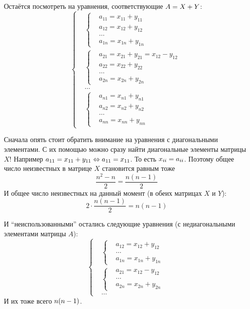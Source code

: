\documentclass[a4paper,12pt]{article}
\begin{document}
\begin{solution}
    Остаётся посмотреть на уравнения, соответствующие $A \hm= X \hm+ Y$:
    \[
      \left\{
      \begin{aligned}
        &\left\{
        \begin{aligned}
          &a_{11} = x_{11} + y_{11}\\
          &a_{12} = x_{12} + y_{12}\\
          &\ldots\\
          &a_{1n} = x_{1n} + y_{1n}
        \end{aligned}\right.\\
        &\left\{
        \begin{aligned}
          &a_{21} = x_{21} + y_{21} = x_{12} - y_{12}\\
          &a_{22} = x_{22} + y_{22}\\
          &\ldots\\
          &a_{2n} = x_{2n} + y_{2n}
        \end{aligned}\right.\\
        &\ldots\\
        &\left\{
        \begin{aligned}
          &a_{n1} = x_{n1} + y_{n1}\\
          &a_{n2} = x_{n2} + y_{n2}\\
          &\ldots\\
          &a_{nn} = x_{nn} + y_{nn}
        \end{aligned}\right.
      \end{aligned}
      \right.
    \]
    
    Сначала опять стоит обратить внимание на уравнения с диагональными элементами.
    С их помощью можно сразу найти диагональные элементы матрицы $X$!
    Например
    $
      a_{11} \hm= x_{11} \hm+ y_{11} \hm\Leftrightarrow a_{11} \hm= x_{11}
    $.
    То есть $x_{ii} \hm= a_{ii}$.
    Поэтому общее число неизвестных в матрице $X$ становится равным тоже
    \[
      \frac{n^2 - n}{2} = \frac{n (n - 1)}{2}
    \]
    И общее число неизвестных на данный момент (в обеих матрицах $X$ и $Y$):
    \[
      2 \cdot \frac{n (n - 1)}{2} = n (n - 1)
    \]
    
    И ``неиспользованными'' остались следующие уравнения (с недиагональными элементами матрицы $A$):
    \[
      \left\{
      \begin{aligned}
        &\left\{
        \begin{aligned}
          &a_{12} = x_{12} + y_{12}\\
          &\ldots\\
          &a_{1n} = x_{1n} + y_{1n}
        \end{aligned}\right.\\
        &\left\{
        \begin{aligned}
          &a_{21} = x_{12} - y_{12}\\
          &\ldots\\
          &a_{2n} = x_{2n} + y_{2n}
        \end{aligned}\right.\\
        &\ldots
      \end{aligned}
      \right.
    \]
    И их тоже всего $n (n \hm- 1)$.
    

\end{solution}
\end{document}
